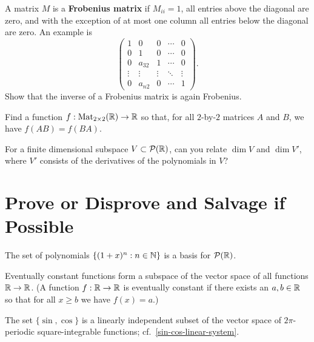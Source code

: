 \documentclass{homework}
\begin{document}
\begin{problem}\label{frobenius-matrix}A matrix $M$ is a \textbf{Frobenius matrix} if $M_{ii} = 1$, all
  entries above the diagonal are zero, and with the exception of at
  most one column all entries below the diagonal are zero.  An example is
  \[\begin{pmatrix}
      1&0&0&\cdots &0\\
      0&1&0&\cdots &0\\
      0&a_{32}&1&\cdots &0\\
      \vdots &\vdots &\vdots &\ddots &\vdots \\
      0&a_{n2}&0&\cdots &1
    \end{pmatrix}.\]
  Show that the inverse of a Frobenius matrix is again Frobenius.
\end{problem}

\begin{problem}
  Find a function $f : \operatorname{Mat}_{2\times 2}(\mathbb{R}) \to \mathbb{R}$ so that, for all
  $2$-by-$2$ matrices $A$ and $B$, we have $f(AB) = f(BA)$.
\end{problem}

\begin{problem}
  For a finite dimensional subspace $V \subset \mathcal{P}(\mathbb{R})$, can
  you relate $\dim V$ and $\dim V'$, where $V'$ consists of the
  derivatives of the polynomials in $V$?
\end{problem}

\section{Prove or Disprove and Salvage if Possible}

\begin{problem}
  The set of polynomials $\{ (1+x)^n : n \in \mathbb{N} \}$ is a basis for
  $\mathcal{P}(\mathbb{R})$.
\end{problem}

\begin{problem}
  Eventually constant functions form a subspace of the vector space of
  all functions $\mathbb{R} \to \mathbb{R}$.  (A function $f : \mathbb{R} \to \mathbb{R}$ is eventually
  constant if there exists an $a,b \in \mathbb{R}$ so that for all $x \geq b$
  we have $f(x) = a$.)
\end{problem}

\begin{problem}\label{sin-cos-indie}The set $\{ \sin, \cos \}$ is a linearly independent subset of the
  vector space of $2\pi$-periodic square-integrable functions;
  cf.~\ref{sin-cos-linear-system}.
\end{problem}
\end{document}
